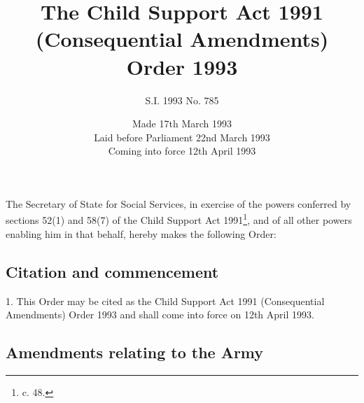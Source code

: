 \documentclass[a4paper]{article}
\title{The Child Support Act 1991 (Consequential Amendments) Order 1993}
\author{S.I. 1993 No. 785}
\date{Made 17th March 1993\\Laid before Parliament 22nd March 1993\\Coming into force 12th April 1993}
\begin{document}
\maketitle

\noindent
The Secretary of State for Social Services, in exercise of the powers conferred by sections 52(1) and 58(7) of the Child Support Act 1991\footnote{ c. 48.}, and of all other powers enabling him in that behalf, hereby makes the following Order:

{\sloppy

\tableofcontents

}

\setcounter{secnumdepth}{-2}

\subsection[1. Citation and commencement]{Citation and commencement}

1.  This Order may be cited as the Child Support Act 1991 (Consequential Amendments) Order 1993 and shall come into force on 12th April 1993.

\subsection[2. Amendments relating to the Army]{Amendments relating to the Army}
\end{document}
